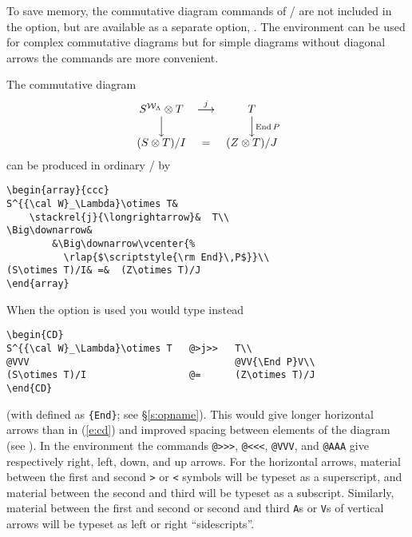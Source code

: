 To save memory, the commutative diagram commands of \amstex/ are not
included in the  option, but are available as a separate
option, .  The  environment
can be used for complex commutative diagrams but for
simple diagrams without diagonal arrows the   commands are more
convenient.

The commutative diagram
\begin{equation}\label{e:cd}
\begin{array}{ccc}
S^{{\cal W}_\Lambda}\otimes T&
   \stackrel{j}{\longrightarrow}&  T\\
\Big\downarrow&
       &\Big\downarrow\vcenter{\rlap{$\scriptstyle{\rm End}\,P$}}\\
(S\otimes T)/I& =&  (Z\otimes T)/J
\end{array}
\end{equation}
can be produced in ordinary \latex/ by
\begin{verbatim}
\begin{array}{ccc}
S^{{\cal W}_\Lambda}\otimes T&
    \stackrel{j}{\longrightarrow}&  T\\
\Big\downarrow&
        &\Big\downarrow\vcenter{%
          \rlap{$\scriptstyle{\rm End}\,P$}}\\
(S\otimes T)/I& =&  (Z\otimes T)/J
\end{array}
\end{verbatim}
When the  option is used you would type instead
\begin{verbatim}
\begin{CD}
S^{{\cal W}_\Lambda}\otimes T   @>j>>   T\\
@VVV                                    @VV{\End P}V\\
(S\otimes T)/I                  @=      (Z\otimes T)/J
\end{CD}
\end{verbatim}
(with  defined as \verb={End}=; see
\S\ref{s:opname}).
This would give longer horizontal arrows than in (\ref{e:cd})
and improved spacing between
elements of the diagram (see ). In the  environment
the commands \verb=@>>>=, \verb=@<<<=,
\verb=@VVV=, and \verb=@AAA= give respectively right, left, down, and
up arrows.%
%
%
%
For the horizontal arrows, material between the first and second
\verb=>= or \verb=<= symbols will be typeset as a superscript,
and material between the second and third will be typeset as
a subscript.  Similarly, material between the first and second
or second and third {\tt A}s or {\tt V}s of vertical arrows will be typeset as
left or right ``sidescripts''.

